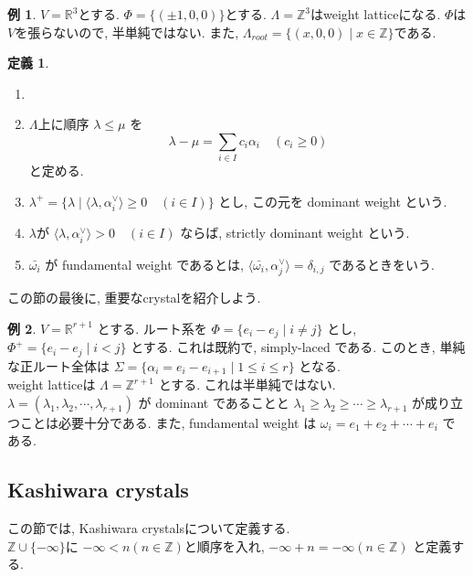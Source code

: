 \documentclass[a4,12pt, titlepage]{jarticle}
\theoremstyle{definition}
\newtheorem{df}{定義}
\newtheorem*{ex}{例}
\begin{document}
\begin{ex}
  $V = \mathbb{R}^3$とする. $\Phi = \{ (\pm1, 0, 0) \}$とする. $\Lambda = \mathbb{Z}^3$はweight latticeになる.
  $\Phi$は$V$を張らないので, 半単純ではない. また, $\Lambda_{ root } = \{ (x, 0 , 0) \mid x \in \mathbb{Z} \}$である.
\end{ex}

\begin{df}
  \begin{enumerate}
    \item []
    \item $\Lambda$上に順序 $\lambda \leq \mu$ を
      $$ \lambda - \mu = \sum_{i \in I} c_i \alpha_i \quad ( c_i \geq 0 ) $$
      と定める.
    \item $\lambda^{+} = \{ \lambda \mid \langle \lambda, \alpha_i^{\vee} \rangle \geq 0 \quad (i \in I) \}$ とし, この元を dominant weight という.
    \item $\lambda$が $\langle \lambda, \alpha_i^{\vee} \rangle > 0 \quad (i \in I)$ ならば, strictly dominant weight という.
    \item $\bar{\omega_i}$ が fundamental weight であるとは, $\langle \bar{\omega_i}, \alpha_j^{\vee} \rangle = \delta_{i, j}$
    であるときをいう.
  \end{enumerate}
\end{df}

この節の最後に, 重要なcrystalを紹介しよう.

\begin{ex}
  $V = \mathbb{R}^{r+1}$ とする. ルート系を $\Phi = \{ e_i - e_j \mid i \neq j \}$ とし, $\Phi^{+} = \{ e_i - e_j \mid i < j \}$ とする.
  これは既約で, simply-laced である. このとき, 単純な正ルート全体は $\Sigma = \{ \alpha_i = e_i - e_{i+1} \mid 1 \leq i \leq r \}$ となる. \\
  weight latticeは $\Lambda = \mathbb{Z}^{r+1}$ とする. これは半単純ではない. \\
  $\lambda = (\lambda_1, \lambda_2, \cdots, \lambda_{r+1})$ が dominant であることと $\lambda_1 \geq \lambda_2 \geq \cdots \geq \lambda_{r+1}$
  が成り立つことは必要十分である. また, fundamental weight は $\omega_i = e_1 + e_2 + \cdots + e_i$ である.
\end{ex}


%
\subsection{Kashiwara crystals}
この節では, Kashiwara crystalsについて定義する. \\
$\mathbb{Z} \cup \{ - \infty \} $に $- \infty < n ( n \in \mathbb{Z} ) $と順序を入れ, $ - \infty + n = - \infty ( n \in \mathbb{Z} ) $
と定義する.
\end{document}

